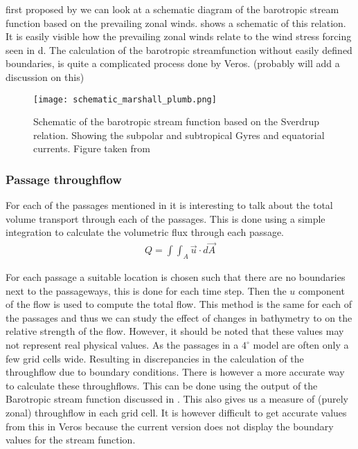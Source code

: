 first proposed by \cite{sverdrup1947wind} we can look at a schematic diagram of the barotropic stream function based on the prevailing zonal winds.  shows a schematic of this relation. It is easily visible how the prevailing zonal winds relate to the wind stress forcing seen in d. The calculation of the barotropic streamfunction without easily defined boundaries, is quite a complicated process done by Veros. (probably will add a discussion on this)
 
  \begin{figure}[H]
 	\texttt{[image: schematic\_marshall\_plumb.png]}
 	\caption{Schematic of the barotropic stream function based on the Sverdrup relation. Showing the subpolar and subtropical Gyres and equatorial currents. Figure taken from \cite{MarschallPlumb}}
 	\label{fig:schem_currents}
 \end{figure}
\subsubsection{Passage throughflow}\label{sec:throughflowp}
For each of the passages mentioned in  it is interesting to talk about the total volume transport through each of the passages. This is done using a simple integration to calculate the volumetric flux through each passage.
\begin{align}
Q = \int \int_A \vec{u} \cdot d\vec{A}
\end{align}	

For each passage a suitable location is chosen such that there are no boundaries next to the passageways, this is done for each time step. Then the $u$ component of the flow is used to compute the total flow. This method is the same for each of the passages and thus we can study the effect of changes in bathymetry to on the relative strength of the flow. However, it should be noted that these values may not represent real physical values. As the passages in a $4^{\circ}$ model are often only a few grid cells wide. Resulting in discrepancies in the calculation of the throughflow due to boundary conditions. 
There is however a more accurate way to calculate these throughflows. This can be done using the output of the Barotropic stream function discussed in . This also gives us a measure of (purely zonal) throughflow in each grid cell. It is however difficult to get accurate values from this in Veros because the current version does not display the boundary values for the stream function.

